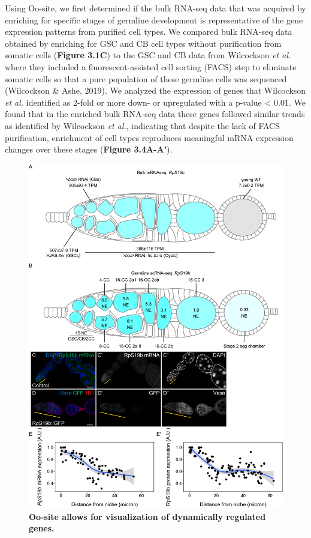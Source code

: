 \documentclass[12pt,oneside]{reedthesis}
\begin{document}

Using Oo-site, we first determined if the bulk RNA-seq data that was
acquired by enriching for specific stages of germline development is
representative of the gene expression patterns from purified cell types.
We compared bulk RNA-seq data obtained by enriching for GSC and CB cell
types without purification from somatic cells (\textbf{Figure 3.1C}) to the GSC
and CB data from Wilcockson \emph{et al.} where they included a
fluorescent-assisted cell sorting (FACS) step to eliminate somatic cells
so that a pure population of these germline cells was sequenced
(Wilcockson \& Ashe, 2019). We analyzed the
expression of genes that Wilcockson \emph{et al.} identified as 2-fold or
more down- or upregulated with a p-value \textless{} 0.01. We found that in the
enriched bulk RNA-seq data these genes followed similar trends as
identified by Wilcockson \emph{et al.}, indicating that despite the lack of
FACS purification, enrichment of cell types reproduces meaningful mRNA
expression changes over these stages (\textbf{Figure 3.4A-A'}).
\begin{figure}

{\centering \includegraphics[width=1\linewidth]{./figure/Oo_site/Figure2} 

}

\caption[\textbf{Oo-site allows for visualization of dynamically regulated genes.}]{\textbf{Oo-site allows for visualization of dynamically regulated genes.}}\label{fig:oosite-fig-3}
\end{figure}
\end{document}
